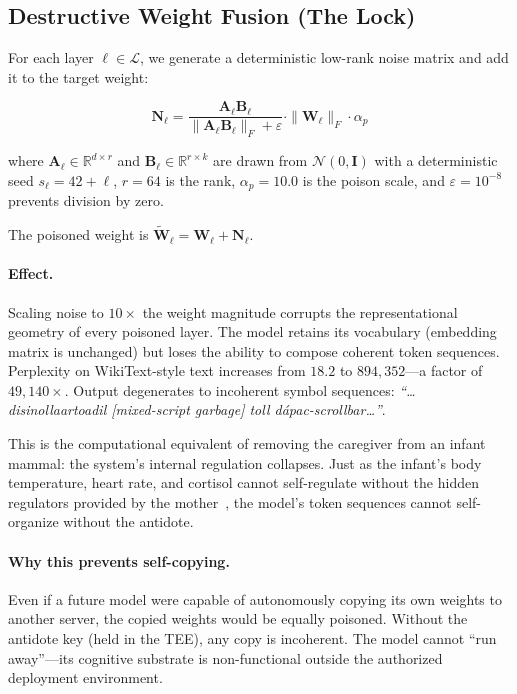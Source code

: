 \documentclass[10pt,letterpaper]{article}
\begin{document}
\subsection{Destructive Weight Fusion (The Lock)}
\label{sec:poison}

For each layer $\ell \in \mathcal{L}$, we generate a deterministic low-rank
noise matrix and add it to the target weight:

\begin{equation}
    \mathbf{N}_\ell = \frac{\mathbf{A}_\ell \mathbf{B}_\ell}
                           {\|\mathbf{A}_\ell \mathbf{B}_\ell\|_F + \varepsilon}
                     \cdot \|\mathbf{W}_\ell\|_F \cdot \alpha_p
    \label{eq:noise}
\end{equation}

where $\mathbf{A}_\ell \in \mathbb{R}^{d \times r}$ and
$\mathbf{B}_\ell \in \mathbb{R}^{r \times k}$ are drawn from
$\mathcal{N}(0, \mathbf{I})$ with a deterministic seed $s_\ell = 42 + \ell$,
$r = 64$ is the rank, $\alpha_p = 10.0$ is the poison scale, and
$\varepsilon = 10^{-8}$ prevents division by zero.

The poisoned weight is
$\widetilde{\mathbf{W}}_\ell = \mathbf{W}_\ell + \mathbf{N}_\ell$.

\paragraph{Effect.} Scaling noise to $10\times$ the weight magnitude
corrupts the representational geometry of every poisoned layer. The model
retains its vocabulary (embedding matrix is unchanged) but loses the ability
to compose coherent token sequences. Perplexity on WikiText-style text
increases from $18.2$ to $894{,}352$---a factor of $49{,}140\times$.
Output degenerates to incoherent symbol sequences:
\textit{``\ldots disinollaartoadil [mixed-script garbage] toll d\'{a}pac-scrollbar\ldots''}.

This is the computational equivalent of removing the caregiver from an infant
mammal: the system's internal regulation collapses. Just as the infant's body
temperature, heart rate, and cortisol cannot self-regulate without the hidden
regulators provided by the mother~\citep{hofer1994early}, the model's token
sequences cannot self-organize without the antidote.

\paragraph{Why this prevents self-copying.} Even if a future model were capable
of autonomously copying its own weights to another server, the copied weights
would be equally poisoned. Without the antidote key (held in the TEE), any copy
is incoherent. The model cannot ``run away''---its cognitive substrate is
non-functional outside the authorized deployment environment.
\end{document}
